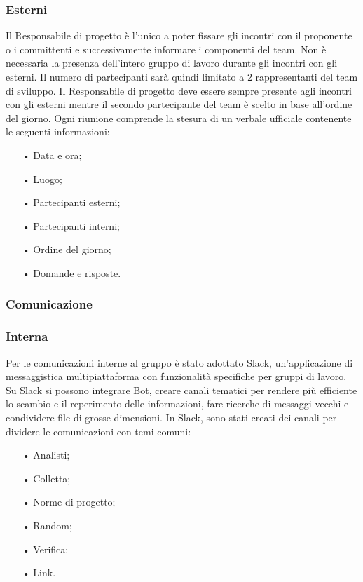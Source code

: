 \subsubsection{Esterni}
Il Responsabile di progetto è l'unico a poter fissare gli incontri con il proponente o i committenti e successivamente informare i componenti del team. Non è necessaria la presenza dell’intero gruppo di lavoro durante gli incontri con gli esterni. Il numero di partecipanti sarà quindi limitato a 2 rappresentanti del team di sviluppo.  
\newline
Il Responsabile di progetto deve essere sempre presente agli incontri con gli esterni mentre il secondo partecipante del team è scelto in base all’ordine del giorno. 
\newline
Ogni riunione comprende la stesura di un verbale ufficiale contenente le seguenti informazioni:
\begin{itemize}
\item[•] Data e ora;
\item[•] Luogo;
\item[•] Partecipanti esterni;
\item[•] Partecipanti interni;
\item[•] Ordine del giorno;
\item[•] Domande e risposte.
\end{itemize}

\subsubsection{Comunicazione}

\subsubsection{Interna}

Per le comunicazioni interne al gruppo è stato adottato {Slack}, un'applicazione di messaggistica multipiattaforma con funzionalità specifiche per gruppi di lavoro.  
\newline
Su Slack si possono integrare {Bot}, creare canali tematici per rendere più efficiente lo scambio e il reperimento delle informazioni, fare ricerche di messaggi vecchi e condividere file di grosse dimensioni.   
\newline
In Slack, sono stati creati dei canali per dividere le comunicazioni con temi comuni:
\begin{itemize}
\item[•] Analisti;
\item[•] Colletta;
\item[•] Norme di progetto;
\item[•] Random;
\item[•] Verifica;
\item[•] Link.
\end{itemize}


